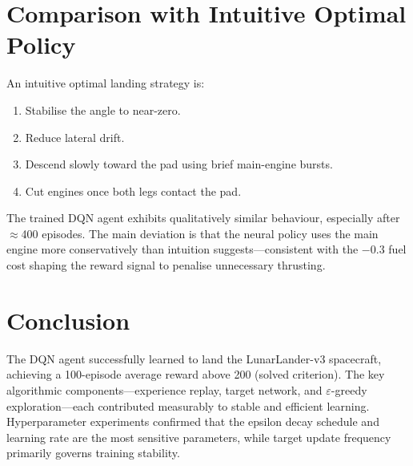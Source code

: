 \documentclass[11pt,a4paper]{article}
\begin{document}
\section{Comparison with Intuitive Optimal Policy}

An intuitive optimal landing strategy is:
\begin{enumerate}
  \item Stabilise the angle to near-zero.
  \item Reduce lateral drift.
  \item Descend slowly toward the pad using brief main-engine bursts.
  \item Cut engines once both legs contact the pad.
\end{enumerate}

The trained DQN agent exhibits qualitatively similar behaviour,
especially after $\approx$400 episodes.  The main deviation is that
the neural policy uses the main engine more conservatively than
intuition suggests—consistent with the $-0.3$ fuel cost shaping
the reward signal to penalise unnecessary thrusting.

\section{Conclusion}

The DQN agent successfully learned to land the LunarLander-v3
spacecraft, achieving a 100-episode average reward above 200 (solved
criterion).  The key algorithmic components—experience replay, target
network, and $\varepsilon$-greedy exploration—each contributed
measurably to stable and efficient learning.  Hyperparameter
experiments confirmed that the epsilon decay schedule and learning
rate are the most sensitive parameters, while target update frequency
primarily governs training stability.
\end{document}
